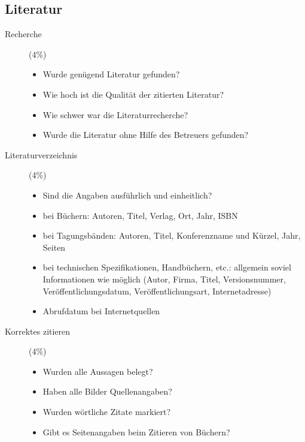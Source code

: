 \documentclass[final,bibliography=totocnumbered]{include/sikseminar}
\begin{document}
\subsection{Literatur}
\begin{description}
  \item[Recherche] (4\%)
    \begin{itemize}
      \item Wurde genügend Literatur gefunden?
      \item Wie hoch ist die Qualität der zitierten Literatur?
      \item Wie schwer war die Literaturrecherche?
      \item Wurde die Literatur ohne Hilfe des Betreuers gefunden?
    \end{itemize}
  \item[Literaturverzeichnis] (4\%)
    \begin{itemize}
      \item Sind die Angaben ausführlich und einheitlich?
      \item bei Büchern: Autoren, Titel, Verlag, Ort, Jahr, ISBN
      \item bei Tagungsbänden: Autoren, Titel, Konferenzname und Kürzel, Jahr, Seiten
      \item bei technischen Spezifikationen, Handbüchern, etc.: allgemein soviel 
    Informationen wie möglich (Autor, Firma, Titel, Versionsnummer, Veröffentlichungsdatum, Veröffentlichungsart, Internetadresse)
      \item Abrufdatum bei Internetquellen
    \end{itemize}
  \item[Korrektes zitieren] (4\%)
    \begin{itemize}
      \item Wurden alle Aussagen belegt?
      \item Haben alle Bilder Quellenangaben?
      \item Wurden wörtliche Zitate markiert?
      \item Gibt es Seitenangaben beim Zitieren von Büchern?
    \end{itemize}
\end{description}
\end{document}
